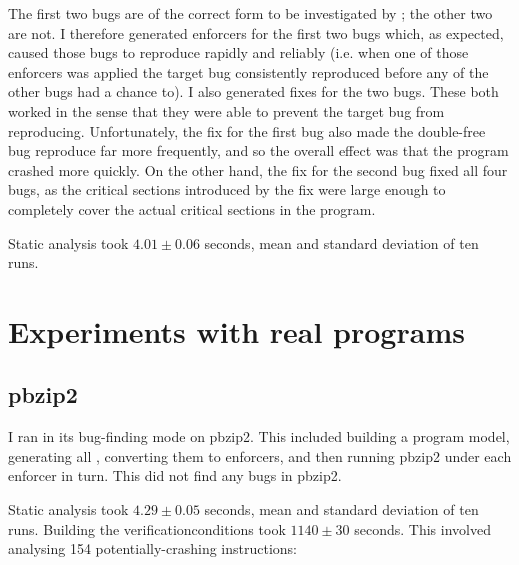 
The first two bugs are of the correct form to be investigated by
{\technique}; the other two are not.  I therefore generated enforcers
for the first two bugs which, as expected, caused those bugs to
reproduce rapidly and reliably (i.e. when one of those enforcers was
applied the target bug consistently reproduced before any of the other
bugs had a chance to).  I also generated fixes for the two bugs.
These both worked in the sense that they were able to prevent the
target bug from reproducing.  Unfortunately, the fix for the first bug
also made the double-free bug reproduce far more frequently, and so
the overall effect was that the program crashed more quickly.  On the
other hand, the fix for the second bug fixed all four bugs, as the
critical sections introduced by the fix were large enough to
completely cover the actual critical sections in the program.



Static analysis took $4.01 \pm 0.06$ seconds, mean and standard
deviation of ten runs.

\section{Experiments with real programs}
\label{sect:eval:real}

\subsection{pbzip2}

  I
ran {\implementation} in its bug-finding mode on pbzip2.  This
included building a program model, generating all {\StateMachines},
converting them to enforcers, and then running pbzip2 under each
enforcer in turn.  This did not find any bugs in pbzip2.

Static analysis took $4.29 \pm 0.05$ seconds, mean and standard
deviation of ten runs.  Building the \glspl{verificationcondition}
took $1140 \pm 30$ seconds.  This involved analysing 154
potentially-crashing instructions:

